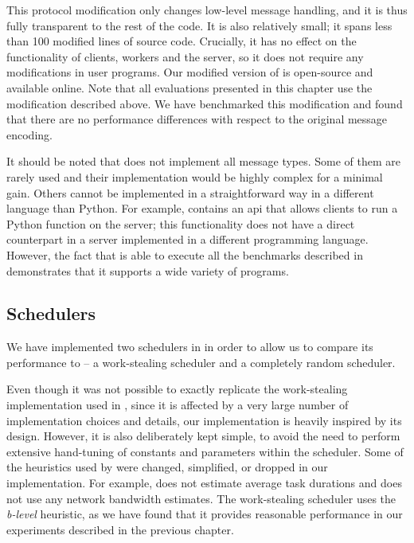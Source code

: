This protocol modification only changes low-level message handling, and it is thus fully
transparent to the rest of the code. It is also relatively small; it spans less than 100 modified
lines of \dask{} source code. Crucially, it has no effect on the functionality
of clients, workers and the server, so it does not require any modifications in
\dask{} user programs. Our modified version of \dask{} is
open-source and available online. Note that all evaluations presented in
this chapter use the modification described above. We have benchmarked this modification and found
that there are no performance differences with respect to the original \dask{}
message encoding.

It should be noted that \rsds{} does not implement all
\dask{} message types. Some of them are rarely used and their implementation
would be highly complex for a minimal gain. Others cannot be implemented in a straightforward way
in a different language than Python. For example, \dask{} contains an
\gls{api} that allows clients to run a Python function on the server; this
functionality does not have a direct counterpart in a server implemented in a different programming
language. However, the fact that \rsds{} is able to execute all the benchmarks
described in~ demonstrates that it supports a wide variety of
\dask{} programs.

\subsection*{Schedulers}
We have implemented two schedulers in \rsds{} in order to allow us to compare
its performance to \dask{} -- a work-stealing scheduler and a completely random
scheduler.

Even though it was not possible to exactly replicate the work-stealing implementation used in
\dask{}, since it is affected by a very large number of implementation choices
and details, our implementation is heavily inspired by its design. However, it is also deliberately
kept simple, to avoid the need to perform extensive hand-tuning of constants and parameters within
the scheduler. Some of the heuristics used by \dask{} were changed, simplified,
or dropped in our implementation. For example, \rsds{} does not estimate
average task durations and does not use any network bandwidth estimates. The work-stealing
scheduler uses the \emph{b-level} heuristic, as we have found that it provides
reasonable performance in our experiments described in the previous chapter.

